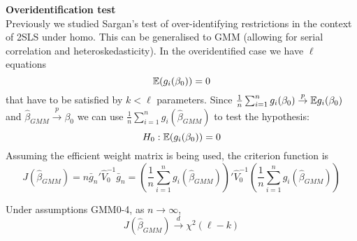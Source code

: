 \documentclass[DIV=14,titlepage=false]{scrreprt}
\begin{document}
\textbf{Overidentification test}\\
Previously we studied Sargan's test of over-identifying restrictions in the context of 2SLS under homo. This can be generalised to GMM (allowing for serial correlation and heteroskedasticity). In the overidentified case we have $\ell$ equations \[\mathbb{E} (g_i(\beta_0))=0\] that have to be satisfied by $k<\ell$ parameters. Since $\frac{1}{n}\sum_{i=1}^{n}g_i(\beta_0)\overset{p}{\to}\mathbb{E} g_i(\beta_0)$ and $\hat\beta_{GMM} \overset{p}{\to} \beta_0$ we can use $\frac{1}{n}\sum_{i=1}^{n}g_i(\hat\beta_{GMM})$ to test the hypothesis:
\[
    H_0: \mathbb{E} (g_i(\beta_0))=0
\]
Assuming the efficient weight matrix is being used, the criterion function is 
\[
    J(\hat\beta_{GMM}) =n\bar g_n' \hat V_0^{-1} \bar g_n = \left( \frac{1}{n}\sum_{i=1}^{n}g_i(\hat\beta_{GMM})\right)' \hat V_0^{-1} \left( \frac{1}{n}\sum_{i=1}^{n}g_i(\hat\beta_{GMM})\right)
\]
\begin{theorem}
    Under assumptions GMM0-4, as $n\to \infty$, \[ J(\hat\beta_{GMM}) \overset{d}{\to} \chi^2(\ell -k)\]
\end{theorem}
\end{document}
